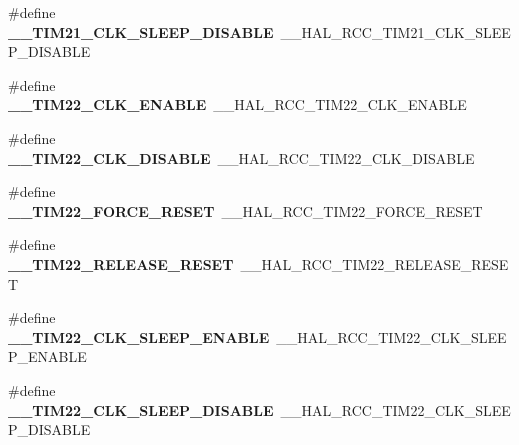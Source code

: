 \begin{DoxyCompactItemize}
\mbox{\label{group___h_a_l___r_c_c___aliased_ga2079771896a6ffc761933edb8bcaaa11}} 
\#define {\bfseries \+\_\+\+\_\+\+T\+I\+M21\+\_\+\+C\+L\+K\+\_\+\+S\+L\+E\+E\+P\+\_\+\+D\+I\+S\+A\+B\+LE}~\+\_\+\+\_\+\+H\+A\+L\+\_\+\+R\+C\+C\+\_\+\+T\+I\+M21\+\_\+\+C\+L\+K\+\_\+\+S\+L\+E\+E\+P\+\_\+\+D\+I\+S\+A\+B\+LE
\item 
\mbox{\label{group___h_a_l___r_c_c___aliased_ga1cb31ba98237a6cf0ef42a744cb85492}} 
\#define {\bfseries \+\_\+\+\_\+\+T\+I\+M22\+\_\+\+C\+L\+K\+\_\+\+E\+N\+A\+B\+LE}~\+\_\+\+\_\+\+H\+A\+L\+\_\+\+R\+C\+C\+\_\+\+T\+I\+M22\+\_\+\+C\+L\+K\+\_\+\+E\+N\+A\+B\+LE
\item 
\mbox{\label{group___h_a_l___r_c_c___aliased_ga866ebd9a0fc9021e63853457d20b24da}} 
\#define {\bfseries \+\_\+\+\_\+\+T\+I\+M22\+\_\+\+C\+L\+K\+\_\+\+D\+I\+S\+A\+B\+LE}~\+\_\+\+\_\+\+H\+A\+L\+\_\+\+R\+C\+C\+\_\+\+T\+I\+M22\+\_\+\+C\+L\+K\+\_\+\+D\+I\+S\+A\+B\+LE
\item 
\mbox{\label{group___h_a_l___r_c_c___aliased_ga3366750cb7794db4d1d46dd8d968038d}} 
\#define {\bfseries \+\_\+\+\_\+\+T\+I\+M22\+\_\+\+F\+O\+R\+C\+E\+\_\+\+R\+E\+S\+ET}~\+\_\+\+\_\+\+H\+A\+L\+\_\+\+R\+C\+C\+\_\+\+T\+I\+M22\+\_\+\+F\+O\+R\+C\+E\+\_\+\+R\+E\+S\+ET
\item 
\mbox{\label{group___h_a_l___r_c_c___aliased_ga1519bba7d69761e2198845ce7697a92b}} 
\#define {\bfseries \+\_\+\+\_\+\+T\+I\+M22\+\_\+\+R\+E\+L\+E\+A\+S\+E\+\_\+\+R\+E\+S\+ET}~\+\_\+\+\_\+\+H\+A\+L\+\_\+\+R\+C\+C\+\_\+\+T\+I\+M22\+\_\+\+R\+E\+L\+E\+A\+S\+E\+\_\+\+R\+E\+S\+ET
\item 
\mbox{\label{group___h_a_l___r_c_c___aliased_ga97b8627f8f78a55d70a6c50241c43a2f}} 
\#define {\bfseries \+\_\+\+\_\+\+T\+I\+M22\+\_\+\+C\+L\+K\+\_\+\+S\+L\+E\+E\+P\+\_\+\+E\+N\+A\+B\+LE}~\+\_\+\+\_\+\+H\+A\+L\+\_\+\+R\+C\+C\+\_\+\+T\+I\+M22\+\_\+\+C\+L\+K\+\_\+\+S\+L\+E\+E\+P\+\_\+\+E\+N\+A\+B\+LE
\item 
\mbox{\label{group___h_a_l___r_c_c___aliased_gaa0747e8119f9798cffed35b6312a90ca}} 
\#define {\bfseries \+\_\+\+\_\+\+T\+I\+M22\+\_\+\+C\+L\+K\+\_\+\+S\+L\+E\+E\+P\+\_\+\+D\+I\+S\+A\+B\+LE}~\+\_\+\+\_\+\+H\+A\+L\+\_\+\+R\+C\+C\+\_\+\+T\+I\+M22\+\_\+\+C\+L\+K\+\_\+\+S\+L\+E\+E\+P\+\_\+\+D\+I\+S\+A\+B\+LE

\end{DoxyCompactItemize}

